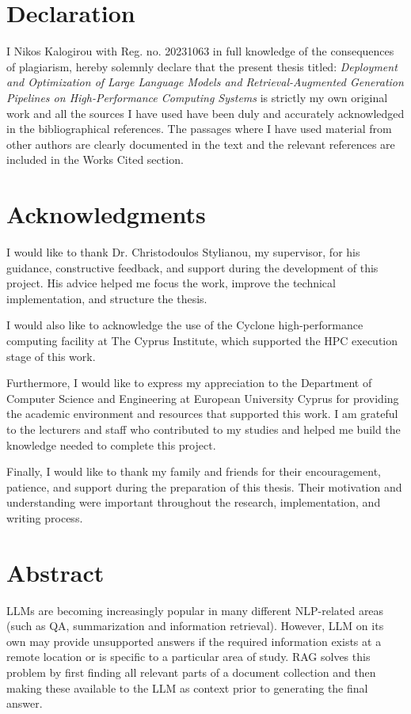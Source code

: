 \hypersetup{pageanchor=false}
\pagestyle{empty}

\chapter*{Declaration}
\thispagestyle{empty}
I Nikos Kalogirou with Reg. no. 20231063 in full knowledge of the consequences of plagiarism, hereby solemnly declare that the present thesis titled: \textit{Deployment and Optimization of Large Language Models and Retrieval-Augmented Generation Pipelines on High-Performance Computing Systems} is strictly my own original work and all the sources I have used have been duly and accurately acknowledged in the bibliographical references. The passages where I have used material from other authors are clearly documented in the text and the relevant references are included in the Works Cited section.

\clearpage
\chapter*{Acknowledgments}
\thispagestyle{empty}
I would like to thank Dr. Christodoulos Stylianou, my supervisor, for his guidance, constructive feedback, and support during the development of this project. His advice helped me focus the work, improve the technical implementation, and structure the thesis. 

I would also like to acknowledge the use of the Cyclone high-performance computing facility at The Cyprus Institute, which supported the HPC execution stage of this work.

Furthermore, I would like to express my appreciation to the Department of Computer Science and Engineering at European University Cyprus for providing the academic environment and resources that supported this work. I am grateful to the lecturers and staff who contributed to my studies and helped me build the knowledge needed to complete this project.

Finally, I would like to thank my family and friends for their encouragement, patience, and support during the preparation of this thesis. Their motivation and understanding were important throughout the research, implementation, and writing process.

\clearpage
\chapter*{Abstract}
\thispagestyle{empty}
\acp{LLM} are becoming increasingly popular in many different \ac{NLP}-related areas (such as \ac{QA}, summarization and information retrieval). However, \ac{LLM} on its own may provide unsupported answers if the required information exists at a remote location or is specific to a particular area of study. \ac{RAG} solves this problem by first finding all relevant parts of a document collection and then making these available to the \ac{LLM} as context prior to generating the final answer. 

